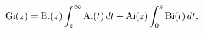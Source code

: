 \[\mathop{\mathrm{Gi}\/}\nolimits\!\left(z\right)=\mathop{\mathrm{Bi}\/}%
\nolimits\!\left(z\right)\int_{z}^{\infty}\mathop{\mathrm{Ai}\/}\nolimits\!%
\left(t\right)dt+\mathop{\mathrm{Ai}\/}\nolimits\!\left(z\right)\int_{0}^{z}%
\mathop{\mathrm{Bi}\/}\nolimits\!\left(t\right)dt,\]